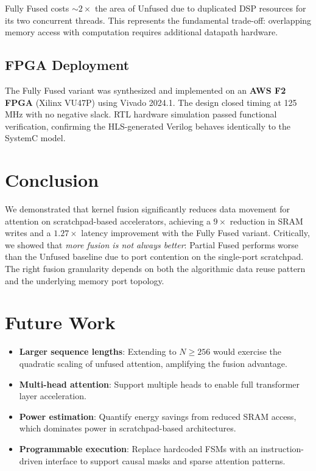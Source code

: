 \documentclass{article}
\begin{document}
Fully Fused costs ${\sim}2\times$ the area of Unfused due to duplicated DSP resources for its two concurrent threads. This represents the fundamental trade-off: overlapping memory access with computation requires additional datapath hardware.


\subsection*{FPGA Deployment}

The Fully Fused variant was synthesized and implemented on an \textbf{AWS F2 FPGA} (Xilinx VU47P) using Vivado 2024.1. The design closed timing at 125\,MHz with no negative slack. RTL hardware simulation passed functional verification, confirming the HLS-generated Verilog behaves identically to the SystemC model.



\section*{Conclusion}

We demonstrated that kernel fusion significantly reduces data movement for attention on scratchpad-based accelerators, achieving a $9\times$ reduction in SRAM writes and a $1.27\times$ latency improvement with the Fully Fused variant. Critically, we showed that \textit{more fusion is not always better}: Partial Fused performs worse than the Unfused baseline due to port contention on the single-port scratchpad. The right fusion granularity depends on both the algorithmic data reuse pattern and the underlying memory port topology.



\section*{Future Work}

\begin{itemize}

\item \textbf{Larger sequence lengths}: Extending to $N \geq 256$ would exercise the quadratic scaling of unfused attention, amplifying the fusion advantage.

\item \textbf{Multi-head attention}: Support multiple heads to enable full transformer layer acceleration.

\item \textbf{Power estimation}: Quantify energy savings from reduced SRAM access, which dominates power in scratchpad-based architectures.

\item \textbf{Programmable execution}: Replace hardcoded FSMs with an instruction-driven interface to support causal masks and sparse attention patterns.

\end{itemize}
\end{document}
